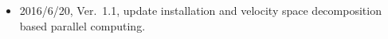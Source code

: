 \begin{itemize}
    \item 2016/6/20, Ver.~1.1, update installation and velocity space decomposition based parallel computing.
\end{itemize}
%

